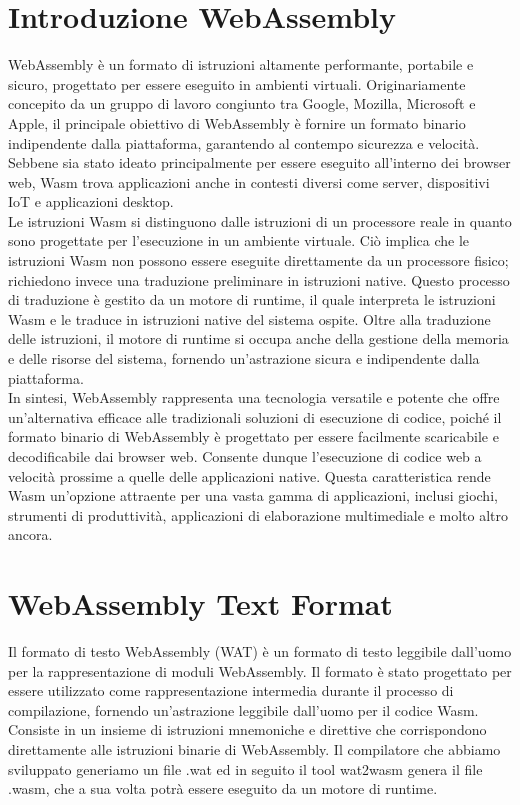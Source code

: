 \documentclass[../../main.tex]{subfiles}
\begin{document}
\section{Introduzione WebAssembly}
WebAssembly è un formato di istruzioni altamente performante, portabile e sicuro, progettato per essere eseguito in ambienti virtuali. Originariamente concepito da un gruppo di lavoro congiunto tra Google, Mozilla, Microsoft e Apple, il principale obiettivo di WebAssembly è fornire un formato binario indipendente dalla piattaforma, garantendo al contempo sicurezza e velocità. Sebbene sia stato ideato principalmente per essere eseguito all'interno dei browser web, Wasm trova applicazioni anche in contesti diversi come server, dispositivi IoT e applicazioni desktop.\\
Le istruzioni Wasm si distinguono dalle istruzioni di un processore reale in quanto sono progettate per l'esecuzione in un ambiente virtuale. Ciò implica che le istruzioni Wasm non possono essere eseguite direttamente da un processore fisico; richiedono invece una traduzione preliminare in istruzioni native. Questo processo di traduzione è gestito da un motore di runtime, il quale interpreta le istruzioni Wasm e le traduce in istruzioni native del sistema ospite. Oltre alla traduzione delle istruzioni, il motore di runtime si occupa anche della gestione della memoria e delle risorse del sistema, fornendo un'astrazione sicura e indipendente dalla piattaforma.\\
In sintesi, WebAssembly rappresenta una tecnologia versatile e potente che offre un'alternativa efficace alle tradizionali soluzioni di esecuzione di codice, poiché il formato binario di WebAssembly è progettato per essere facilmente scaricabile e decodificabile dai browser web. Consente dunque l'esecuzione di codice web a velocità prossime a quelle delle applicazioni native. Questa caratteristica rende Wasm un'opzione attraente per una vasta gamma di applicazioni, inclusi giochi, strumenti di produttività, applicazioni di elaborazione multimediale e molto altro ancora.\autocite{WebAssemblyDoc}

\section{WebAssembly Text Format}
\label{wat}
Il formato di testo WebAssembly (WAT) \autocite{WebAssemblyTextFormat} è un formato di testo leggibile dall'uomo per la rappresentazione di moduli WebAssembly. Il formato è stato progettato per essere utilizzato come rappresentazione intermedia durante il processo di compilazione, fornendo un'astrazione leggibile dall'uomo per il codice Wasm.
Consiste in un insieme di istruzioni mnemoniche e direttive che corrispondono direttamente alle istruzioni binarie di WebAssembly.
Il compilatore che abbiamo sviluppato generiamo un file .wat ed in seguito il tool wat2wasm \autocite{jain2022webassembly} genera il file .wasm, che a sua volta potrà essere eseguito da un motore di runtime.
\end{document}
